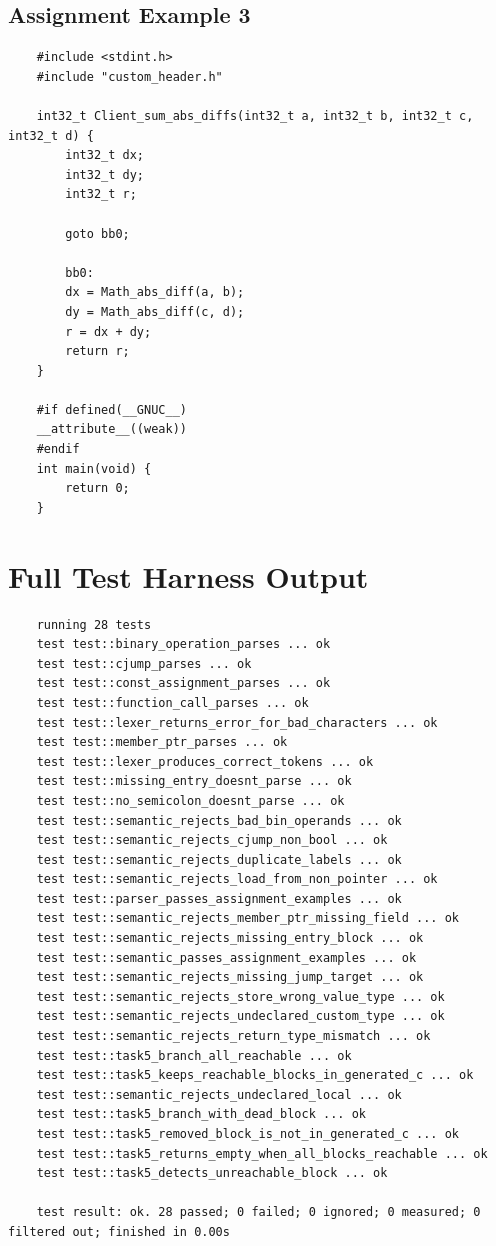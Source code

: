 \documentclass[11pt,a4paper,oneside]{report}
\begin{document}
			\section{Assignment Example 3}
	\begin{lstlisting}
	#include <stdint.h>
	#include "custom_header.h"
	
	int32_t Client_sum_abs_diffs(int32_t a, int32_t b, int32_t c, int32_t d) {
		int32_t dx;
		int32_t dy;
		int32_t r;
		
		goto bb0;
		
		bb0:
		dx = Math_abs_diff(a, b);
		dy = Math_abs_diff(c, d);
		r = dx + dy;
		return r;
	}
	
	#if defined(__GNUC__)
	__attribute__((weak))
	#endif
	int main(void) {
		return 0;
	}

	\end{lstlisting}
	
	
	\chapter{Full Test Harness Output}
	
	\begin{lstlisting}
	running 28 tests
	test test::binary_operation_parses ... ok
	test test::cjump_parses ... ok
	test test::const_assignment_parses ... ok
	test test::function_call_parses ... ok
	test test::lexer_returns_error_for_bad_characters ... ok
	test test::member_ptr_parses ... ok
	test test::lexer_produces_correct_tokens ... ok
	test test::missing_entry_doesnt_parse ... ok
	test test::no_semicolon_doesnt_parse ... ok
	test test::semantic_rejects_bad_bin_operands ... ok
	test test::semantic_rejects_cjump_non_bool ... ok
	test test::semantic_rejects_duplicate_labels ... ok
	test test::semantic_rejects_load_from_non_pointer ... ok
	test test::parser_passes_assignment_examples ... ok
	test test::semantic_rejects_member_ptr_missing_field ... ok
	test test::semantic_rejects_missing_entry_block ... ok
	test test::semantic_passes_assignment_examples ... ok
	test test::semantic_rejects_missing_jump_target ... ok
	test test::semantic_rejects_store_wrong_value_type ... ok
	test test::semantic_rejects_undeclared_custom_type ... ok
	test test::semantic_rejects_return_type_mismatch ... ok
	test test::task5_branch_all_reachable ... ok
	test test::task5_keeps_reachable_blocks_in_generated_c ... ok
	test test::semantic_rejects_undeclared_local ... ok
	test test::task5_branch_with_dead_block ... ok
	test test::task5_removed_block_is_not_in_generated_c ... ok
	test test::task5_returns_empty_when_all_blocks_reachable ... ok
	test test::task5_detects_unreachable_block ... ok
	
	test result: ok. 28 passed; 0 failed; 0 ignored; 0 measured; 0 filtered out; finished in 0.00s

	\end{lstlisting}
	
\end{document}
